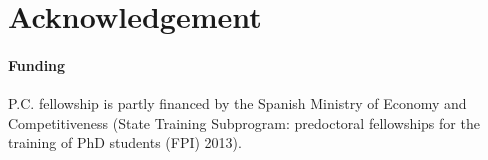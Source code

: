 \documentclass{bioinfo}
\begin{document}
\section*{Acknowledgement}

\paragraph{Funding\textcolon}
P.C. fellowship is partly financed by the Spanish Ministry of Economy and
Competitiveness (State Training Subprogram: predoctoral fellowships for the
training of PhD students (FPI) 2013).



\end{document}
